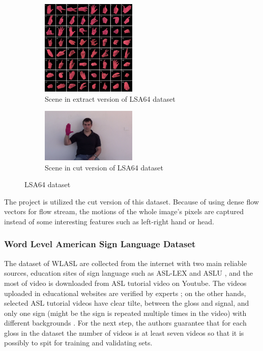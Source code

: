 \documentclass[a4paper, 12pt]{article}
\begin{document}
\begin{figure}[H]
    \centering
    \begin{subfigure}[b]{0.5\textwidth}
        \centering    
        \includegraphics[width=0.5\textwidth]{LSA64_handshapes_grid_8x8.png}
        \caption{Scene in extract version of LSA64 dataset}
    \end{subfigure}
    \hfill
    \begin{subfigure}[b]{0.5\textwidth}
        \centering    
        \includegraphics[width=0.5\textwidth]{LSA64.png}
        \caption{Scene in cut version of LSA64 dataset}
    \end{subfigure}
    \caption{LSA64 dataset}
    \label{LSA64}
\end{figure}

The project is utilized the cut version of this dataset. Because of using dense flow vectors for flow stream, the motions of the whole image's pixels are captured instead of some interesting features such as left-right hand or head.

\subsubsection{Word Level American Sign Language Dataset}
The dataset of WLASL are collected from the internet with two main reliable sources, education sites of sign language such as ASL-LEX and ASLU \citep{li2020word}, and the most of video is downloaded from ASL tutorial video on Youtube. The videos uploaded in educational websites are verified by experts \citep{aslds, caselli2017asl}; on the other hands, selected ASL tutorial videos have clear tilte, between the gloss and signal, and only one sign (might be the sign is repeated multiple times in the video) with different backgrounds \citep{li2020word}. For the next step, the authors guarantee that for each gloss in the dataset the number of videos is at least seven videos so that it is possibly to spit for training and validating sets.
\end{document}
